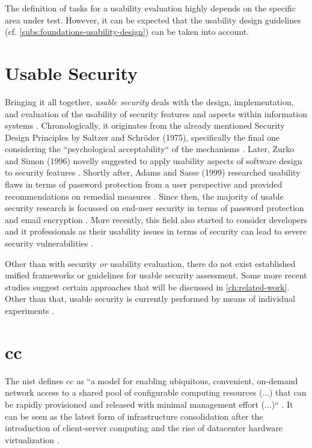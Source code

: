 The definition of tasks for a usability evaluation highly depends on the specific area under test. However, it can be expected that the usability design guidelines (cf. \autoref{subs:foundations-usability-design}) can be taken into account.

\section{Usable Security} \label{sec:foundation-usable_security}

Bringing it all together, \textit{usable security} deals with the design, implementation, and evaluation of the usability of security features and aspects within information systems \cite{reuter_quarter_2022}. Chronologically, it originates from the already mentioned Security Design Principles by Saltzer and Schröder (1975), specifically the final one considering the ``psychological acceptability`` of the mechanisms \cites{reuter_quarter_2022}{saltzer_protection_1975}. Later, Zurko and Simon (1996) novelly suggested to apply usability aspects of software design to security features \cite{zurko_user-centered_1996}. Shortly after, Adams and Sasse (1999) researched usability flaws in terms of password protection from a user perspective and provided recommendations on remedial measures \cite{adams_users_1999}. Since then, the majority of usable security research is focussed on end-user security in terms of password protection and email encryption \cites{reuter_quarter_2022}{whitten_why_1999}. More recently, this field also started to consider developers and \ac{it} professionals as their usability issues in terms of security can lead to severe security vulnerabilities \cite{chiasson_even_2007-1}.

Other than with security \textit{or} usability evaluation, there do not exist established unified frameworks or guidelines for usable security assessment. Some more recent studies suggest certain approaches that will be discussed in \autoref{ch:related-work}. Other than that, usable security is currently performed by means of individual experiments \cite{garfinkel_usable_2014}.

\section{\acl{cc}} \label{sec:foundations-cloud}

The \ac{nist} defines \ac{cc} as ``a model for enabling ubiquitous, convenient, on-demand network access to a shared pool of configurable computing resources (...) that can be rapidly provisioned and released with minimal management effort (...)`` \cite{mell_nist_2011}. It can be seen as the latest form of infrastructure consolidation after the introduction of client-server computing and the rise of datacenter hardware virtualization \cite[p.\ 1]{sehgal_cloud_2018}.
		
